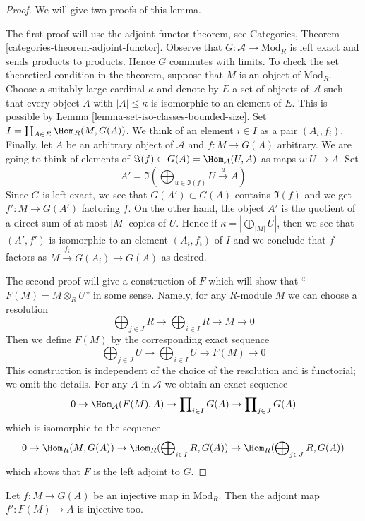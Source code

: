 \begin{proof}
We will give two proofs of this lemma.

\medskip\noindent
The first proof will use the adjoint functor theorem, see
Categories, Theorem \ref{categories-theorem-adjoint-functor}.
Observe that $G : \mathcal{A} \to \text{Mod}_R$ is left exact and sends
products to products. Hence $G$ commutes with limits. To check the set
theoretical condition in the theorem, suppose that $M$ is an object of
$\text{Mod}_R$. Choose a suitably large cardinal $\kappa$ and denote by $E$
a set of objects of $\mathcal{A}$ such that every object $A$ with
$|A| \leq \kappa$ is isomorphic to an element of $E$. This is possible
by Lemma \ref{lemma-set-iso-classes-bounded-size}. Set
$I = \coprod_{A \in E} \Hom_R(M, G(A))$.
We think of an element $i \in I$ as a pair $(A_i, f_i)$.
Finally, let $A$ be an arbitrary object of $\mathcal{A}$
and $f : M \to G(A)$ arbitrary. We are going to think of
elements of $\Im(f) \subset G(A) = \Hom_\mathcal{A}(U, A)$
as maps $u : U \to A$. Set
$$
A' = \Im(\bigoplus\nolimits_{u \in \Im(f)} U \xrightarrow{u} A)
$$
Since $G$ is left exact, we see that $G(A') \subset G(A)$
contains $\Im(f)$ and we get $f' : M \to G(A')$ factoring $f$.
On the other hand, the object $A'$ is
the quotient of a direct sum of at most $|M|$ copies of $U$.
Hence if $\kappa = |\bigoplus_{|M|} U|$, then we see that $(A', f')$
is isomorphic to an element $(A_i, f_i)$ of $I$ and we conclude that $f$
factors as $M \xrightarrow{f_i} G(A_i) \to G(A)$ as desired.

\medskip\noindent
The second proof will give a construction of $F$ which will show
that ``$F(M) = M \otimes_R U$'' in some sense. Namely, for any
$R$-module $M$ we can choose a resolution
$$
\bigoplus\nolimits_{j \in J} R \to
\bigoplus\nolimits_{i \in I} R \to
M \to 0
$$
Then we define $F(M)$ by the corresponding exact sequence
$$
\bigoplus\nolimits_{j \in J} U \to
\bigoplus\nolimits_{i \in I} U \to
F(M) \to 0
$$
This construction is independent of the choice of the resolution
and is functorial; we omit the details.
For any $A$ in $\mathcal{A}$ we obtain an exact sequence
$$
0 \to \Hom_\mathcal{A}(F(M), A) \to
\prod\nolimits_{i \in I} G(A) \to
\prod\nolimits_{j \in J} G(A)
$$
which is isomorphic to the sequence
$$
0 \to \Hom_R(M, G(A)) \to
\Hom_R(\bigoplus\nolimits_{i \in I} R, G(A)) \to
\Hom_R(\bigoplus\nolimits_{j \in J} R, G(A))
$$
which shows that $F$ is the left adjoint to $G$.
\end{proof}

\begin{lemma}
\label{lemma-F-G-monos}
Let $f : M \to G(A)$ be an injective map in $\text{Mod}_R$.
Then the adjoint map $f' : F(M) \to A$ is injective too.
\end{lemma}

